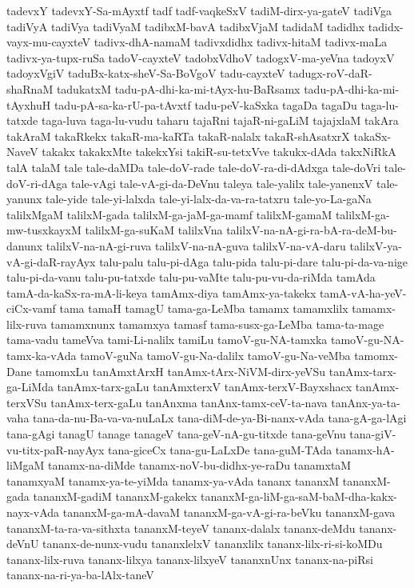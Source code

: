 {tadevxY
tadevxY-Sa-mAyxtf
tadf
tadf-vaqkeSxV
tadiM-dirx-ya-gateV
tadiVga
tadiVyA
tadiVya
tadiVyaM
tadibxM-bavA
tadibxVjaM
tadidaM
tadidhx
tadidx-vayx-mu-cayxteV
tadivx-dhA-namaM
tadivxdidhx
tadivx-hitaM
tadivx-maLa
tadivx-ya-tupx-ruSa
tadoV-cayxteV
tadobxVdhoV
tadogxV-ma-yeVna
tadoyxV
tadoyxVgiV
taduBx-katx-sheV-Sa-BoVgoV
tadu-cayxteV
tadugx-roV-daR-shaRnaM
tadukatxM
tadu-pA-dhi-ka-mi-tAyx-hu-BaRsamx
tadu-pA-dhi-ka-mi-tAyxhuH
tadu-pA-sa-ka-rU-pa-tAvxtf
tadu-peV-kaSxka
tagaDa
tagaDu
taga-lu-tatxde
taga-luva
taga-lu-vudu
taharu
tajaRni
tajaR-ni-gaLiM
tajajxlaM
takAra
takAraM
takaRkekx
takaR-ma-kaRTa
takaR-nalalx
takaR-shAsatxrX
takaSx-NaveV
takakx
takakxMte
takekxYsi
takiR-su-tetxVve
takukx-dAda
takxNiRkA
talA
talaM
tale
tale-daMDa
tale-doV-rade
tale-doV-ra-di-dAdxga
tale-doVri
tale-doV-ri-dAga
tale-vAgi
tale-vA-gi-da-DeVnu
taleya
tale-yalilx
tale-yanenxV
tale-yanunx
tale-yide
tale-yi-lalxda
tale-yi-lalx-da-va-ra-tatxru
tale-yo-La-gaNa
talilxMgaM
talilxM-gada
talilxM-ga-jaM-ga-mamf
talilxM-gamaM
talilxM-ga-mw-tusxkayxM
talilxM-ga-suKaM
talilxVna
talilxV-na-nA-gi-ra-bA-ra-deM-bu-danunx
talilxV-na-nA-gi-ruva
talilxV-na-nA-guva
talilxV-na-vA-daru
talilxV-ya-vA-gi-daR-rayAyx
talu-palu
talu-pi-dAga
talu-pida
talu-pi-dare
talu-pi-da-va-nige
talu-pi-da-vanu
talu-pu-tatxde
talu-pu-vaMte
talu-pu-vu-da-riMda
tamAda
tamA-da-kaSx-ra-mA-li-keya
tamAmx-diya
tamAmx-ya-takekx
tamA-vA-ha-yeV-ciCx-vamf
tama
tamaH
tamagU
tama-ga-LeMba
tamamx
tamamxlilx
tamamx-lilx-ruva
tamamxnunx
tamamxya
tamasf
tama-susx-ga-LeMba
tama-ta-mage
tama-vadu
tameVva
tami-Li-nalilx
tamiLu
tamoV-gu-NA-tamxka
tamoV-gu-NA-tamx-ka-vAda
tamoV-guNa
tamoV-gu-Na-dalilx
tamoV-gu-Na-veMba
tamomx-Dane
tamomxLu
tanAmxtArxH
tanAmx-tArx-NiVM-dirx-yeVSu
tanAmx-tarx-ga-LiMda
tanAmx-tarx-gaLu
tanAmxterxV
tanAmx-terxV-Bayxshacx
tanAmx-terxVSu
tanAmx-terx-gaLu
tanAnxma
tanAnx-tamx-ceV-ta-nava
tanAnx-ya-ta-vaha
tana-da-nu-Ba-va-va-nuLaLx
tana-diM-de-ya-Bi-nanx-vAda
tana-gA-ga-lAgi
tana-gAgi
tanagU
tanage
tanageV
tana-geV-nA-gu-titxde
tana-geVnu
tana-giV-vu-titx-paR-nayAyx
tana-giceCx
tana-gu-LaLxDe
tana-guM-TAda
tanamx-hA-liMgaM
tanamx-na-diMde
tanamx-noV-bu-didhx-ye-raDu
tanamxtaM
tanamxyaM
tanamx-ya-te-yiMda
tanamx-ya-vAda
tananx
tananxM
tananxM-gada
tananxM-gadiM
tananxM-gakekx
tananxM-ga-liM-ga-saM-baM-dha-kakx-nayx-vAda
tananxM-ga-mA-davaM
tananxM-ga-vA-gi-ra-beVku
tananxM-gava
tananxM-ta-ra-va-sithxta
tananxM-teyeV
tananx-dalalx
tananx-deMdu
tananx-deVnU
tananx-de-nunx-vudu
tananxlelxV
tananxlilx
tananx-lilx-ri-si-koMDu
tananx-lilx-ruva
tananx-lilxya
tananx-lilxyeV
tananxnUnx
tananx-na-piRsi
tananx-na-ri-ya-ba-lAlx-taneV
}
